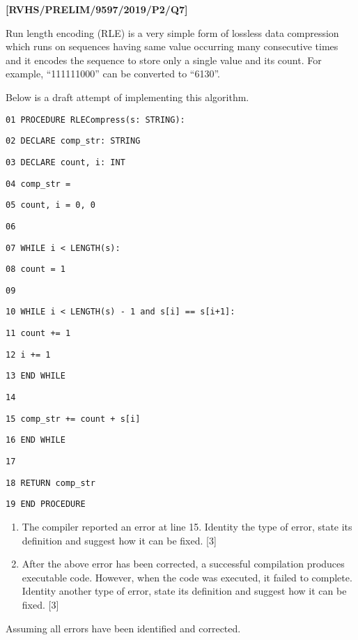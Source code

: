 \item \textbf{{[}RVHS/PRELIM/9597/2019/P2/Q7{]} }

Run length encoding (RLE) is a very simple form of lossless data compression
which runs on sequences having same value occurring many consecutive
times and it encodes the sequence to store only a single value and
its count. For example, \textquotedblleft 111111000\textquotedblright{}
can be converted to \textquotedblleft 6130\textquotedblright .

Below is a draft attempt of implementing this algorithm. 

\noindent %
\noindent\begin{minipage}[t]{1\columnwidth}%
\texttt{01 PROCEDURE RLECompress(s: STRING): }

\texttt{02 \qquad{}DECLARE comp\_str: STRING }

\texttt{03 \qquad{}DECLARE count, i: INT }

\texttt{04 \qquad{}comp\_str = \textquotedbl\textquotedbl{} }

\texttt{05 \qquad{}count, i = 0, 0 }

\texttt{06 }

\texttt{07 \qquad{}WHILE i < LENGTH(s): }

\texttt{08 \qquad{}\qquad{}count = 1 }

\texttt{09 }

\texttt{10 \qquad{}\qquad{}WHILE i < LENGTH(s) - 1 and s{[}i{]}
== s{[}i+1{]}:}

\texttt{11 \qquad{}\qquad{}\qquad{}count += 1 }

\texttt{12 \qquad{}\qquad{}\qquad{}i += 1 }

\texttt{13 \qquad{}\qquad{}END WHILE }

\texttt{14 }

\texttt{15 \qquad{}\qquad{}comp\_str += count + s{[}i{]} }

\texttt{16 \qquad{}END WHILE }

\texttt{17 }

\texttt{18 \qquad{}RETURN comp\_str }

\texttt{19 END PROCEDURE}%
\end{minipage}
\begin{enumerate}
\item The compiler reported an error at line 15. Identity the type of error,
state its definition and suggest how it can be fixed.\hfill{} {[}3{]}
\item After the above error has been corrected, a successful compilation
produces executable code. However, when the code was executed, it
failed to complete. Identity another type of error, state its definition
and suggest how it can be fixed. \hfill{}{[}3{]}
\end{enumerate}
Assuming all errors have been identified and corrected.

